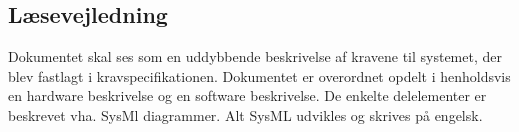 \subsection{Læsevejledning}
Dokumentet skal ses som en uddybbende beskrivelse af kravene til systemet, der blev fastlagt i kravspecifikationen. Dokumentet er overordnet opdelt i henholdsvis en hardware beskrivelse og en software beskrivelse. 
De enkelte delelementer er beskrevet vha. SysMl diagrammer. Alt SysML udvikles og skrives på engelsk.